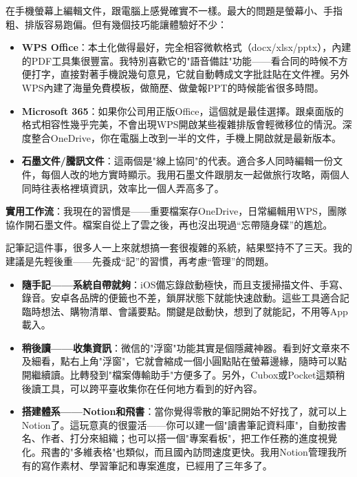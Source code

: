 


在手機螢幕上編輯文件，跟電腦上感覺確實不一樣。最大的問題是螢幕小、手指粗、排版容易跑偏。但有幾個技巧能讓體驗好不少：

\begin{itemize}
  \item \textbf{WPS Office}：本土化做得最好，完全相容微軟格式（docx/xlsx/pptx），內建的PDF工具集很豐富。我特別喜歡它的"語音備註"功能——看合同的時候不方便打字，直接對著手機說幾句意見，它就自動轉成文字批註貼在文件裡。另外WPS內建了海量免費模板，做簡歷、做彙報PPT的時候能省很多時間。
  \item \textbf{Microsoft 365}：如果你公司用正版Office，這個就是最佳選擇。跟桌面版的格式相容性幾乎完美，不會出現WPS開啟某些複雜排版會輕微移位的情況。深度整合OneDrive，你在電腦上改到一半的文件，手機上開啟就是最新版本。
  \item \textbf{石墨文件/騰訊文件}：這兩個是"線上協同"的代表。適合多人同時編輯一份文件，每個人改的地方實時顯示。我用石墨文件跟朋友一起做旅行攻略，兩個人同時往表格裡填資訊，效率比一個人弄高多了。
\end{itemize}

\textbf{實用工作流}：我現在的習慣是——重要檔案存OneDrive，日常編輯用WPS，團隊協作開石墨文件。檔案自從上了雲之後，再也沒出現過“忘帶隨身碟”的尷尬。


記筆記這件事，很多人一上來就想搞一套很複雜的系統，結果堅持不了三天。我的建議是先輕後重——先養成“記”的習慣，再考慮“管理”的問題。

\begin{itemize}
  \item \textbf{隨手記——系統自帶就夠}：iOS備忘錄啟動極快，而且支援掃描文件、手寫、錄音。安卓各品牌的便籤也不差，鎖屏狀態下就能快速啟動。這些工具適合記臨時想法、購物清單、會議要點。關鍵是啟動快，想到了就能記，不用等App載入。
  \item \textbf{稍後讀——收集資訊}：微信的"浮窗"功能其實是個隱藏神器。看到好文章來不及細看，點右上角"浮窗"，它就會縮成一個小圓點貼在螢幕邊緣，隨時可以點開繼續讀。比轉發到"檔案傳輸助手"方便多了。另外，Cubox或Pocket這類稍後讀工具，可以跨平臺收集你在任何地方看到的好內容。
  \item \textbf{搭建體系——Notion和飛書}：當你覺得零散的筆記開始不好找了，就可以上Notion了。這玩意真的很靈活——你可以建一個"讀書筆記資料庫"，自動按書名、作者、打分來組織；也可以搭一個"專案看板"，把工作任務的進度視覺化。飛書的"多維表格"也類似，而且國內訪問速度更快。我用Notion管理我所有的寫作素材、學習筆記和專案進度，已經用了三年多了。
\end{itemize}

